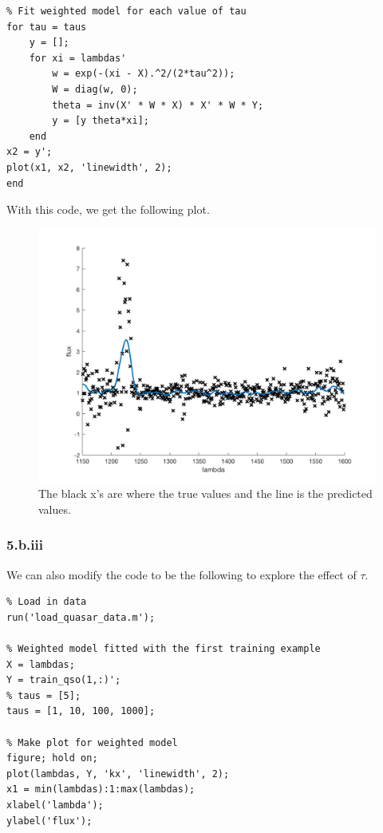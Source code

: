 \documentclass[11pt,a4paper,titlepage]{article}
\begin{document}
{{{\begin{lstlisting}
% Fit weighted model for each value of tau
for tau = taus   
    y = [];
    for xi = lambdas'
        w = exp(-(xi - X).^2/(2*tau^2));
        W = diag(w, 0);
        theta = inv(X' * W * X) * X' * W * Y;
        y = [y theta*xi];
    end
x2 = y';
plot(x1, x2, 'linewidth', 2);
end
\end{lstlisting}
With this code, we get the following plot.
\begin{figure}[H]
\centering
\includegraphics[width=6.5in]{ps1_5b2}
\caption{The black x's are where the true values and the line is the predicted values.}
\end{figure}
}\label{prob:5b2}
\subsubsection*{5.b.iii}{
We can also modify the code to be the following to explore the effect of $\tau$.
\begin{lstlisting}
% Load in data
run('load_quasar_data.m');

% Weighted model fitted with the first training example
X = lambdas;
Y = train_qso(1,:)';
% taus = [5];
taus = [1, 10, 100, 1000];

% Make plot for weighted model
figure; hold on;
plot(lambdas, Y, 'kx', 'linewidth', 2);
x1 = min(lambdas):1:max(lambdas);
xlabel('lambda');
ylabel('flux');


\end{lstlisting}}}}
\end{document}
